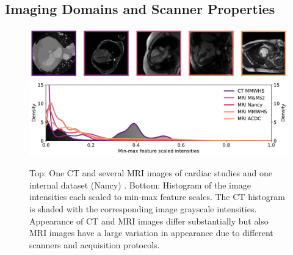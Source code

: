     \subsection{Imaging Domains and Scanner Properties} %

        \begin{figure}
            \begin{minipage}{\textwidth}
                \centering
                \includegraphics[width=.89\textwidth]{sections/02_background/figures/contrast_imgs.pdf}
                \includegraphics[width=\textwidth]{sections/02_background/figures/contrast_histograms.pdf}
                \caption{Top: One \ac{CT} and several \ac{MRI} images of cardiac studies and one internal dataset (Nancy) \citep{zhuang2019evaluation,martin2023deep,
                campello2021multi,bernard2018deep}. Bottom: Histogram of the image intensities each scaled to min-max feature scales. The \ac{CT} histogram is shaded with the corresponding image grayscale intensities. Appearance of \ac{CT} and \ac{MRI} images differ substantially but also \ac{MRI} images have a large variation in appearance due to different scanners and acquisition protocols.}
                \label{fig:domain_contrast}
            \end{minipage}
        \end{figure}


        \citep{withers2021x}




